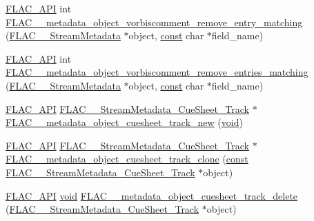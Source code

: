 \begin{DoxyCompactItemize}
\item 
\hyperlink{group__flac__export_ga56ca07df8a23310707732b1c0007d6f5}{F\+L\+A\+C\+\_\+\+A\+PI} int \hyperlink{group__flac__metadata__object_ga6812052a110800bef2f4139017501507}{F\+L\+A\+C\+\_\+\+\_\+metadata\+\_\+object\+\_\+vorbiscomment\+\_\+remove\+\_\+entry\+\_\+matching} (\hyperlink{struct_f_l_a_c_____stream_metadata}{F\+L\+A\+C\+\_\+\+\_\+\+Stream\+Metadata} $\ast$object, \hyperlink{zconf_8h_a2c212835823e3c54a8ab6d95c652660e}{const} char $\ast$field\+\_\+name)
\item 
\hyperlink{group__flac__export_ga56ca07df8a23310707732b1c0007d6f5}{F\+L\+A\+C\+\_\+\+A\+PI} int \hyperlink{group__flac__metadata__object_ga525525f5f21b1caee776cba3cfb6d72f}{F\+L\+A\+C\+\_\+\+\_\+metadata\+\_\+object\+\_\+vorbiscomment\+\_\+remove\+\_\+entries\+\_\+matching} (\hyperlink{struct_f_l_a_c_____stream_metadata}{F\+L\+A\+C\+\_\+\+\_\+\+Stream\+Metadata} $\ast$object, \hyperlink{zconf_8h_a2c212835823e3c54a8ab6d95c652660e}{const} char $\ast$field\+\_\+name)
\item 
\hyperlink{group__flac__export_ga56ca07df8a23310707732b1c0007d6f5}{F\+L\+A\+C\+\_\+\+A\+PI} \hyperlink{struct_f_l_a_c_____stream_metadata___cue_sheet___track}{F\+L\+A\+C\+\_\+\+\_\+\+Stream\+Metadata\+\_\+\+Cue\+Sheet\+\_\+\+Track} $\ast$ \hyperlink{group__flac__metadata__object_ga9bc27c6ed075c29d12027079e00d9997}{F\+L\+A\+C\+\_\+\+\_\+metadata\+\_\+object\+\_\+cuesheet\+\_\+track\+\_\+new} (\hyperlink{png_8h_ac9c84fa68bbad002983e35ce3663c686}{void})
\item 
\hyperlink{group__flac__export_ga56ca07df8a23310707732b1c0007d6f5}{F\+L\+A\+C\+\_\+\+A\+PI} \hyperlink{struct_f_l_a_c_____stream_metadata___cue_sheet___track}{F\+L\+A\+C\+\_\+\+\_\+\+Stream\+Metadata\+\_\+\+Cue\+Sheet\+\_\+\+Track} $\ast$ \hyperlink{group__flac__metadata__object_gaf085bed12af15034839307ca04286d4f}{F\+L\+A\+C\+\_\+\+\_\+metadata\+\_\+object\+\_\+cuesheet\+\_\+track\+\_\+clone} (\hyperlink{zconf_8h_a2c212835823e3c54a8ab6d95c652660e}{const} \hyperlink{struct_f_l_a_c_____stream_metadata___cue_sheet___track}{F\+L\+A\+C\+\_\+\+\_\+\+Stream\+Metadata\+\_\+\+Cue\+Sheet\+\_\+\+Track} $\ast$object)
\item 
\hyperlink{group__flac__export_ga56ca07df8a23310707732b1c0007d6f5}{F\+L\+A\+C\+\_\+\+A\+PI} \hyperlink{png_8h_ac9c84fa68bbad002983e35ce3663c686}{void} \hyperlink{group__flac__metadata__object_ga8fbf8912add405a4b1acd510b6e27c89}{F\+L\+A\+C\+\_\+\+\_\+metadata\+\_\+object\+\_\+cuesheet\+\_\+track\+\_\+delete} (\hyperlink{struct_f_l_a_c_____stream_metadata___cue_sheet___track}{F\+L\+A\+C\+\_\+\+\_\+\+Stream\+Metadata\+\_\+\+Cue\+Sheet\+\_\+\+Track} $\ast$object)

\end{DoxyCompactItemize}
